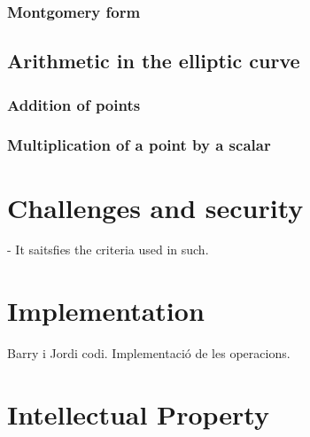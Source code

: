 \documentclass{article}
\begin{document}
		\subsubsection{Montgomery form}
	\subsection{Arithmetic in the elliptic curve}
	 	\subsubsection{Addition of points}
	 	\subsubsection{Multiplication of a point by a scalar}
 
\section{Challenges and security}	
 - It saitsfies the criteria used in such. 
	
\section{Implementation}						
Barry i Jordi codi. Implementació de les operacions.
	
\section {Intellectual Property}	
	
	\cite{generation-baby}

	\newpage
	
	
\end{document}
